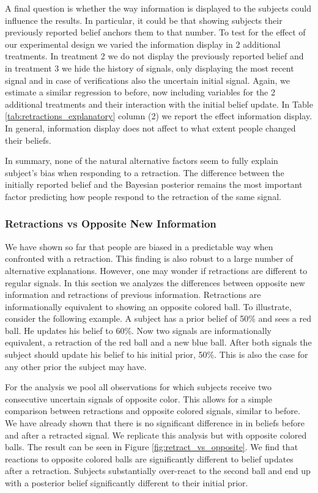 \documentclass{article}
\begin{document}
A final question is whether the way information is displayed to the subjects could influence the results. In particular, it could be that showing subjects their previously reported belief anchors them to that number. To test for the effect of our experimental design we varied the information display in  2 additional treatments. In treatment 2 we do not display the previously reported belief and in treatment 3 we hide the history of signals, only displaying the most recent signal and in case of verifications also the uncertain initial signal. Again, we estimate a similar regression to before, now including variables for the 2 additional treatments and their interaction with the initial belief update. In Table \ref{tab:retractions_explanatory} column (2) we report the effect information display. In general, information display does not affect to what extent people changed their beliefs. 

In summary, none of the natural alternative factors seem to fully explain subject's bias when responding to a retraction. The difference between the initially reported belief and the Bayesian posterior remains the most important factor predicting how people respond to the retraction of the same signal.


\subsubsection{Retractions vs Opposite New Information}

We have shown so far that people are biased in a predictable way when confronted with a retraction. This finding is also robust to a large number of alternative explanations. However, one may wonder if retractions are different to regular signals. In this section we analyzes the differences between opposite new information and retractions of previous information. Retractions are informationally equivalent to showing an opposite colored ball. To illustrate, consider the following example. A subject has a prior belief of 50\% and sees a red ball. He updates his belief to 60\%. Now two signals are informationally equivalent, a retraction of the red ball and a new blue ball. After both signals the subject should update his belief to his initial prior, 50\%. This is also the case for any other prior the subject may have. 

For the analysis we pool all observations for which subjects receive two consecutive uncertain signals of opposite color. This allows for a simple comparison between retractions and opposite colored signals, similar to before. We have already shown that there is no significant difference in in beliefs before and after a retracted signal. We replicate this analysis but with opposite colored balls. The result can be seen in Figure \ref{fig:retract_vs_opposite}. We find that reactions to opposite colored balls are significantly different to belief updates after a retraction. Subjects substantially over-react to the second ball and end up with a posterior belief significantly different to their initial prior.
\end{document}
